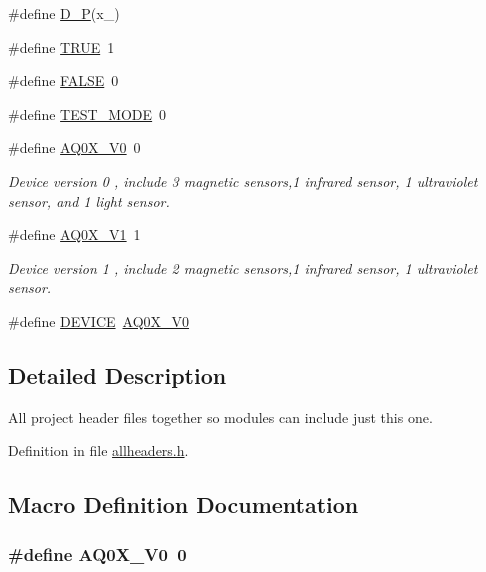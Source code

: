 \begin{DoxyCompactItemize}
\item 
\#define \hyperlink{a00040_aaa56ed691cef86e8de0c4e90e47f2e5d}{D\+\_\+\+P}(x\+\_\+)
\item 
\#define \hyperlink{a00040_aa8cecfc5c5c054d2875c03e77b7be15d}{T\+R\+U\+E}~1
\item 
\#define \hyperlink{a00040_aa93f0eb578d23995850d61f7d61c55c1}{F\+A\+L\+S\+E}~0
\item 
\#define \hyperlink{a00040_ab6d58cce6e97b6b549801e696ac9f4f6}{T\+E\+S\+T\+\_\+\+M\+O\+D\+E}~0
\item 
\#define \hyperlink{a00040_ad750d25410f340cb93a424349ccecdd3}{A\+Q0\+X\+\_\+\+V0}~0
\begin{DoxyCompactList}\small\item\em Device version 0 , include 3 magnetic sensors,1 infrared sensor, 1 ultraviolet sensor, and 1 light sensor. \end{DoxyCompactList}\item 
\#define \hyperlink{a00040_a4fe07f06b0aa99b609cb9f3d37b30932}{A\+Q0\+X\+\_\+\+V1}~1
\begin{DoxyCompactList}\small\item\em Device version 1 , include 2 magnetic sensors,1 infrared sensor, 1 ultraviolet sensor. \end{DoxyCompactList}\item 
\#define \hyperlink{a00040_a775d096fbc3988fb7ed858b79ef44e22}{D\+E\+V\+I\+C\+E}~\hyperlink{a00040_ad750d25410f340cb93a424349ccecdd3}{A\+Q0\+X\+\_\+\+V0}
\end{DoxyCompactItemize}


\subsection{Detailed Description}
All project header files together so modules can include just this one. 



Definition in file \hyperlink{a00040_source}{allheaders.\+h}.



\subsection{Macro Definition Documentation}
\hypertarget{a00040_ad750d25410f340cb93a424349ccecdd3}{
\subsubsection[{A\+Q0\+X\+\_\+\+V0}]{\setlength{\rightskip}{0pt plus 5cm}\#define A\+Q0\+X\+\_\+\+V0~0}}\label{a00040_ad750d25410f340cb93a424349ccecdd3}


